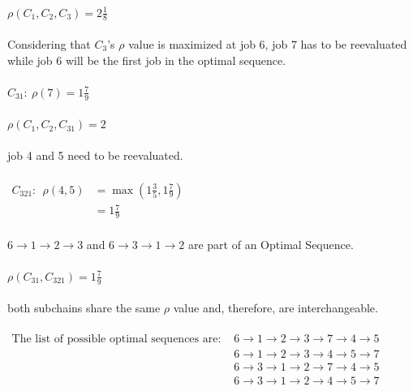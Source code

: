 \documentclass[a4paper, fleqn]{article}
\begin{document}
\vspace{1pt}\\
$\rho(C_1,C_2,C_3)=2\frac{1}{8}$\\
\vspace{1pt}\\
Considering that $C_3$'s $\rho$ value is maximized at job 6, job 7 has to be reevaluated while job 6 will be the first job in the optimal sequence.\\
\vspace{1pt}\\
$C_{31}:\ \rho(7)=1\frac{7}{9}$\\
\vspace{1pt}\\
$\rho(C_1,C_2,C_{31})=2$\\
\vspace{1pt}\\
job 4 and 5 need to be reevaluated.\\
\vspace{1pt}\\
$\begin{aligned}C_{321}:\ \ \rho(4,5)&=\max\left(1\frac{3}{5},1\frac{7}{9}\right)\\&=1\frac{7}{9}\end{aligned}$\\
\vspace{1pt}\\
$6\rightarrow1\rightarrow2\rightarrow3$ and $6\rightarrow3\rightarrow1\rightarrow2$ are part of an Optimal Sequence.\\
\vspace{1pt}\\
$\rho(C_{31},C_{321})=1\frac{7}{9}$\\
\vspace{1pt}\\
both subchains share the same $\rho$ value and, therefore, are interchangeable.\\
\vspace{1pt}\\
$\begin{aligned}\text{The list of possible optimal sequences are: }& 6\rightarrow1\rightarrow2\rightarrow3\rightarrow7\rightarrow4\rightarrow5\\& 6\rightarrow1\rightarrow2\rightarrow3\rightarrow4\rightarrow5\rightarrow7\\& 6\rightarrow3\rightarrow1\rightarrow2\rightarrow7\rightarrow4\rightarrow5\\& 6\rightarrow3\rightarrow1\rightarrow2\rightarrow4\rightarrow5\rightarrow7\end{aligned}$
\pagebreak
\end{document}

